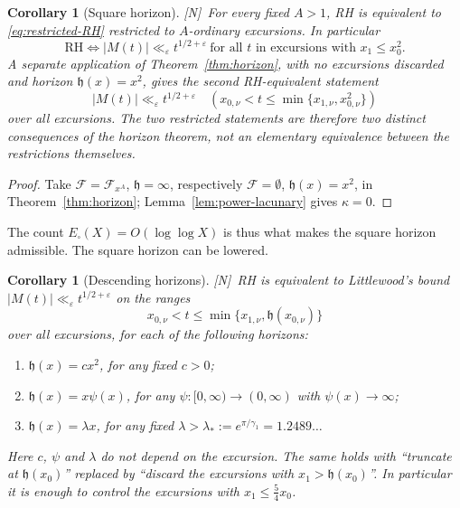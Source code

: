 \documentclass[11pt,reqno]{amsart}
\numberwithin{equation}{section}
\theoremstyle{plain}
\newtheorem{corollary}[theorem]{Corollary}
\theoremstyle{definition}
\theoremstyle{remark}
\newcommand{\eps}{\varepsilon}
\newcommand{\F}{\mathcal{F}}
\newcommand{\tagN}{\textup{[N]}}
\begin{document}
\begin{corollary}[Square horizon]
\label{cor:power-ordinary-RH}
\tagN\ For every fixed $A>1$, RH is equivalent to \eqref{eq:restricted-RH}
restricted to $A$-ordinary excursions. In particular
\begin{equation}
\label{eq:square-horizon-RH}
\boxed{\ \mathrm{RH}\iff
|M(t)|\ll_\eps t^{1/2+\eps}
\ \text{for all $t$ in excursions with }x_1\le x_0^2.\ }
\end{equation}
A separate application of Theorem~\ref{thm:horizon}, with no excursions
discarded and horizon $\mathfrak h(x)=x^2$, gives the second RH-equivalent
statement
\begin{equation}
 |M(t)|\ll_\eps t^{1/2+\eps}
 \quad(x_{0,\nu}<t\le\min\{x_{1,\nu},x_{0,\nu}^2\})
\end{equation}
over all excursions.  The two restricted statements are therefore two
distinct consequences of the horizon theorem, not an elementary equivalence
between the restrictions themselves.
\end{corollary}

\begin{proof}
Take $\F=\F_{x^A}$, $\mathfrak h=\infty$, respectively $\F=\emptyset$, $\mathfrak h(x)=x^2$, in
Theorem~\ref{thm:horizon}; Lemma~\ref{lem:power-lacunary} gives
$\kappa=0$.
\end{proof}

The count $E_\square(X)=O(\log\log X)$ is thus what makes the square
horizon admissible. The square horizon can be lowered.

\begin{corollary}[Descending horizons]
\label{cor:descending}
\tagN\ RH is equivalent to Littlewood's bound
$|M(t)|\ll_\eps t^{1/2+\eps}$ on the ranges
\begin{equation}
x_{0,\nu}<t\le\min\{x_{1,\nu},\mathfrak h(x_{0,\nu})\}
\end{equation}
over all excursions, for each of the following horizons:
\begin{enumerate}[label=\textup{(\roman*)}]
\item $\mathfrak h(x)=cx^2$, for any fixed $c>0$;
\item $\mathfrak h(x)=x\psi(x)$, for any $\psi:[0,\infty)\to(0,\infty)$ with $\psi(x)\to\infty$;
\item $\mathfrak h(x)=\lambda x$, for any fixed $\lambda>\lambda_*:=e^{\pi/\gamma_1}=1.2489\ldots$
\end{enumerate}
Here $c$, $\psi$ and $\lambda$ do not depend on the excursion.
The same holds with ``truncate at $\mathfrak h(x_0)$'' replaced by ``discard the
excursions with $x_1>\mathfrak h(x_0)$''. In particular it is enough to control the
excursions with $x_1\le\frac54x_0$.
\end{corollary}
\end{document}

